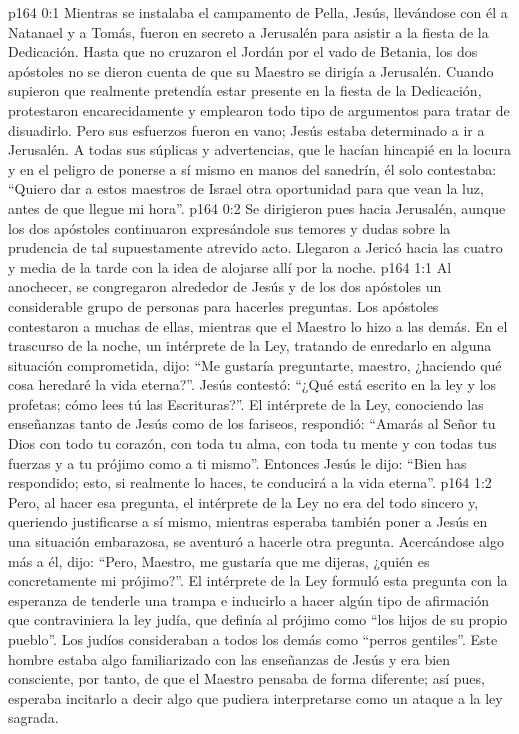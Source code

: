 \author{Comisión de seres intermedios}
\vs p164 0:1 Mientras se instalaba el campamento de Pella, Jesús, llevándose con él a Natanael y a Tomás, fueron en secreto a Jerusalén para asistir a la fiesta de la Dedicación. Hasta que no cruzaron el Jordán por el vado de Betania, los dos apóstoles no se dieron cuenta de que su Maestro se dirigía a Jerusalén. Cuando supieron que realmente pretendía estar presente en la fiesta de la Dedicación, protestaron encarecidamente y emplearon todo tipo de argumentos para tratar de disuadirlo. Pero sus esfuerzos fueron en vano; Jesús estaba determinado a ir a Jerusalén. A todas sus súplicas y advertencias, que le hacían hincapié en la locura y en el peligro de ponerse a sí mismo en manos del sanedrín, él solo contestaba: “Quiero dar a estos maestros de Israel otra oportunidad para que vean la luz, antes de que llegue mi hora”.
\vs p164 0:2 Se dirigieron pues hacia Jerusalén, aunque los dos apóstoles continuaron expresándole sus temores y dudas sobre la prudencia de tal supuestamente atrevido acto. Llegaron a Jericó hacia las cuatro y media de la tarde con la idea de alojarse allí por la noche.
\vs p164 1:1 Al anochecer, se congregaron alrededor de Jesús y de los dos apóstoles un considerable grupo de personas para hacerles preguntas. Los apóstoles contestaron a muchas de ellas, mientras que el Maestro lo hizo a las demás. En el trascurso de la noche, un intérprete de la Ley, tratando de enredarlo en alguna situación comprometida, dijo: “Me gustaría preguntarte, maestro, ¿haciendo qué cosa heredaré la vida eterna?”. Jesús contestó: “¿Qué está escrito en la ley y los profetas; cómo lees tú las Escrituras?”. El intérprete de la Ley, conociendo las enseñanzas tanto de Jesús como de los fariseos, respondió: “Amarás al Señor tu Dios con todo tu corazón, con toda tu alma, con toda tu mente y con todas tus fuerzas y a tu prójimo como a ti mismo”. Entonces Jesús le dijo: “Bien has respondido; esto, si realmente lo haces, te conducirá a la vida eterna”.
\vs p164 1:2 Pero, al hacer esa pregunta, el intérprete de la Ley no era del todo sincero y, queriendo justificarse a sí mismo, mientras esperaba también poner a Jesús en una situación embarazosa, se aventuró a hacerle otra pregunta. Acercándose algo más a él, dijo: “Pero, Maestro, me gustaría que me dijeras, ¿quién es concretamente mi prójimo?”. El intérprete de la Ley formuló esta pregunta con la esperanza de tenderle una trampa e inducirlo a hacer algún tipo de afirmación que contraviniera la ley judía, que definía al prójimo como “los hijos de su propio pueblo”. Los judíos consideraban a todos los demás como “perros gentiles”. Este hombre estaba algo familiarizado con las enseñanzas de Jesús y era bien consciente, por tanto, de que el Maestro pensaba de forma diferente; así pues, esperaba incitarlo a decir algo que pudiera interpretarse como un ataque a la ley sagrada.
